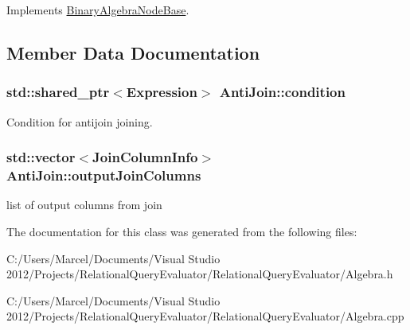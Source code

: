 Implements \hyperlink{class_binary_algebra_node_base_ab6521a638b418e4f0939270bab77b901}{Binary\+Algebra\+Node\+Base}.



\subsection{Member Data Documentation}
\hypertarget{class_anti_join_a55e3da2742c4a24af7eee18cc5309206}{
\subsubsection[{condition}]{\setlength{\rightskip}{0pt plus 5cm}std\+::shared\+\_\+ptr$<${\bf Expression}$>$ Anti\+Join\+::condition}}\label{class_anti_join_a55e3da2742c4a24af7eee18cc5309206}
Condition for antijoin joining. \hypertarget{class_anti_join_af033e50994f2155c9f33926ec2ecd375}{
\subsubsection[{output\+Join\+Columns}]{\setlength{\rightskip}{0pt plus 5cm}std\+::vector$<${\bf Join\+Column\+Info}$>$ Anti\+Join\+::output\+Join\+Columns}}\label{class_anti_join_af033e50994f2155c9f33926ec2ecd375}
list of output columns from join 

The documentation for this class was generated from the following files\+:\begin{DoxyCompactItemize}
\item 
C\+:/\+Users/\+Marcel/\+Documents/\+Visual Studio 2012/\+Projects/\+Relational\+Query\+Evaluator/\+Relational\+Query\+Evaluator/Algebra.\+h\item 
C\+:/\+Users/\+Marcel/\+Documents/\+Visual Studio 2012/\+Projects/\+Relational\+Query\+Evaluator/\+Relational\+Query\+Evaluator/Algebra.\+cpp\end{DoxyCompactItemize}
